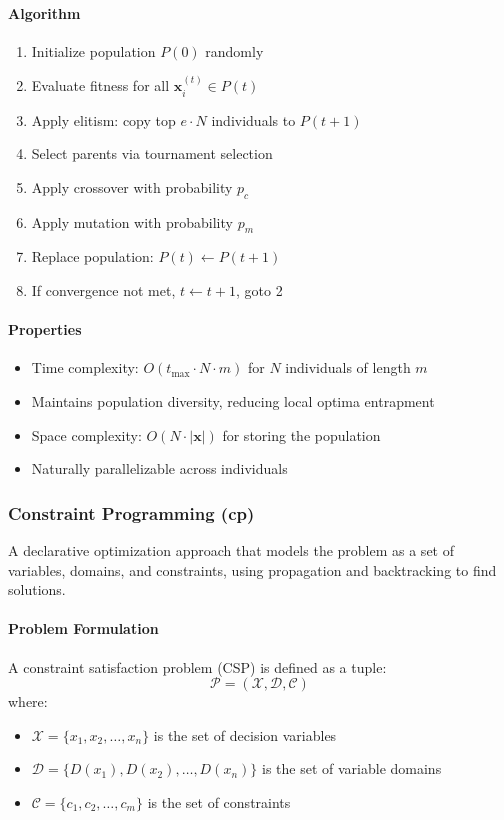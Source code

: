 \paragraph{Algorithm}
\begin{enumerate}
\item Initialize population $P(0)$ randomly
\item Evaluate fitness for all $\mathbf{x}_i^{(t)} \in P(t)$
\item Apply elitism: copy top $e \cdot N$ individuals to $P(t+1)$
\item Select parents via tournament selection
\item Apply crossover with probability $p_c$
\item Apply mutation with probability $p_m$
\item Replace population: $P(t) \leftarrow P(t+1)$
\item If convergence not met, $t \leftarrow t+1$, goto 2
\end{enumerate}

\paragraph{Properties}
\begin{itemize}
\item Time complexity: $O(t_{\max} \cdot N \cdot m)$ for $N$ individuals of length $m$
\item Maintains population diversity, reducing local optima entrapment
\item Space complexity: $O(N \cdot |\mathbf{x}|)$ for storing the population
\item Naturally parallelizable across individuals
\end{itemize}

\subsubsection{Constraint Programming (cp)}
A declarative optimization approach that models the problem as a set of variables, domains, and constraints, using propagation and backtracking to find solutions.

\paragraph{Problem Formulation}
A constraint satisfaction problem (CSP) is defined as a tuple:
\begin{equation}
\mathcal{P} = (\mathcal{X}, \mathcal{D}, \mathcal{C})
\end{equation}
where:
\begin{itemize}
\item $\mathcal{X} = \{x_1, x_2, \ldots, x_n\}$ is the set of decision variables
\item $\mathcal{D} = \{D(x_1), D(x_2), \ldots, D(x_n)\}$ is the set of variable domains
\item $\mathcal{C} = \{c_1, c_2, \ldots, c_m\}$ is the set of constraints
\end{itemize}

